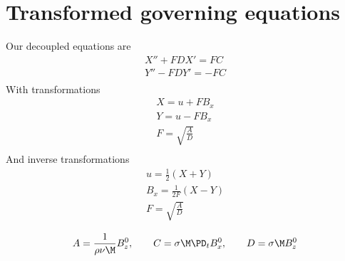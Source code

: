 \documentclass[11pt]{article}
\begin{document}
\doublespacing
\MOONSTITLE
\maketitle

\section{Transformed governing equations}
Our decoupled equations are
\begin{equation}\begin{aligned}
X'' + F D X' =   FC \\
Y'' - F D Y' = - FC \\
\end{aligned} \end{equation}
With transformations
\begin{equation}\begin{aligned}
X = u + F B_x \\
Y = u - F B_x \\
F = \sqrt{\frac{A}{D}} \\
\end{aligned} \end{equation}
And inverse transformations
\begin{equation}\begin{aligned}
u   = \frac{1}{2} \left( X + Y \right) \\
B_x = \frac{1}{2F} \left( X - Y \right) \\
F = \sqrt{\frac{A}{D}} \\
\end{aligned} \end{equation}
\begin{equation}\begin{aligned}
A = \frac{1}{\rho \nu \M} B_z^0, \qquad
C = \sigma \M \PD_t B_x^0, \qquad
D = \sigma \M B_z^0
\end{aligned} \end{equation}
\end{document}
